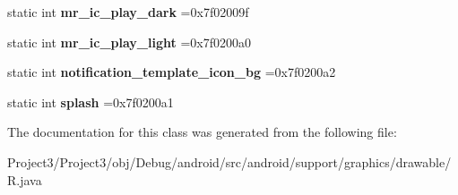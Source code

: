 \begin{DoxyCompactItemize}
\mbox{\label{classandroid_1_1support_1_1graphics_1_1drawable_1_1R_1_1drawable_aa2d0c0e9a10704bf7faefae4f2ba4b32}} 
static int {\bfseries mr\+\_\+ic\+\_\+play\+\_\+dark} =0x7f02009f
\item 
\mbox{\label{classandroid_1_1support_1_1graphics_1_1drawable_1_1R_1_1drawable_a394c199cde2dcba9b4ea4e2a77e13656}} 
static int {\bfseries mr\+\_\+ic\+\_\+play\+\_\+light} =0x7f0200a0
\item 
\mbox{\label{classandroid_1_1support_1_1graphics_1_1drawable_1_1R_1_1drawable_afa247978a470e4a7479a7854e94c8f55}} 
static int {\bfseries notification\+\_\+template\+\_\+icon\+\_\+bg} =0x7f0200a2
\item 
\mbox{\label{classandroid_1_1support_1_1graphics_1_1drawable_1_1R_1_1drawable_ac8d14374ba08a1619edd8f1613541ce9}} 
static int {\bfseries splash} =0x7f0200a1
\end{DoxyCompactItemize}


The documentation for this class was generated from the following file\+:\begin{DoxyCompactItemize}
\item 
Project3/\+Project3/obj/\+Debug/android/src/android/support/graphics/drawable/R.\+java\end{DoxyCompactItemize}

